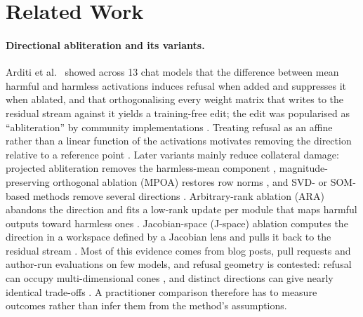 \section{Related Work}
\label{sec:related}

\paragraph{Directional abliteration and its variants.} Arditi et al.~\cite{arditi2024refusal} showed across 13
chat models that the difference between mean harmful and harmless activations induces refusal when added and
suppresses it when ablated, and that orthogonalising every weight matrix that writes to the residual stream against
it yields a training-free edit; the edit was popularised as ``abliteration'' by community implementations
\cite{labonne2024abliteration,failspy_abliterator}. Treating refusal as an affine rather than a linear function of the
activations motivates removing the direction relative to a reference point \cite{marshall2024affine}. Later variants
mainly reduce collateral damage: projected abliteration removes the harmless-mean component \cite{lai2024projected}, magnitude-preserving orthogonal ablation
(MPOA) restores row norms \cite{lai2025mpoa}, and SVD- or SOM-based methods remove several directions
\cite{gabliteration2024,piras2025som}. Arbitrary-rank ablation (ARA) abandons the direction and fits a low-rank
update per module that maps harmful outputs toward harmless ones \cite{weidmann2026ara}. Jacobian-space (J-space)
ablation computes the direction in a workspace defined by a Jacobian lens and pulls it back to the residual stream
\cite{sekinal2026jspace,gurnee2026verbalizable,neuronpedia2026jacobian}. Most of this evidence comes
from blog posts, pull requests and author-run evaluations on few models, and refusal geometry is contested:
refusal can occupy multi-dimensional cones \cite{wollschlager2025geometry}, and distinct directions can give
nearly identical trade-offs \cite{joad2026there}. A practitioner comparison therefore has to measure outcomes
rather than infer them from the method's assumptions.

